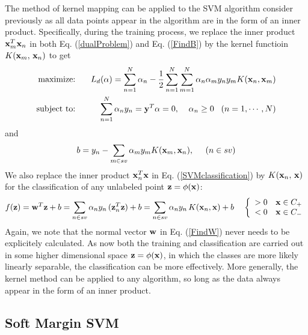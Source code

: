 \documentclass{article}
\begin{document}
The method of kernel mapping can be applied to the SVM algorithm 
consider previously as all data points appear in the algorithm are
in the form of an inner product. Specifically, during the training
process, we replace the inner product ${\bf x}_m^T{\bf x}_n$ in both 
Eq. (\ref{dualProblem}) and Eq. (\ref{FindB}) by the kernel functioin 
$K({\bf x}_m,\,{\bf x}_n)$ to get
\begin{eqnarray}
  \mbox{maximize:} \;\;\; && L_d({\bf\alpha})
  =\sum_{n=1}^N\alpha_n -\frac{1}{2}
  \sum_{n=1}^N \sum_{m=1}^N \alpha_n \alpha_m y_n y_m K({\bf x}_n,{\bf x}_m)
  \nonumber \\
  \mbox{subject to:} \;\;\; && \sum_{n=1}^N \alpha_n y_n
  ={\bf y}^T{\bf\alpha}=0, \;\;\;\; \alpha_n\ge 0\;\;\;(n=1,\cdots,N)
  \label{dualProblemKernel}
\end{eqnarray}
and
\begin{equation}
  b=y_n-\sum_{m \in sv} \alpha_m y_m K({\bf x}_m,{\bf x}_n),\;\;\;\;\;(n\in sv)
  \label{FindBKernel}
\end{equation}
We also replace the inner product ${\bf x}^T_n{\bf x}$ in 
Eq. (\ref{SVMclassification}) by $K({\bf x}_n,\,{\bf x})$ for the 
classification of any unlabeled point ${\bf z}=\phi({\bf x})$:
\begin{equation}
  f({\bf z})={\bf w}^T{\bf z}+b
  =\sum_{n\in sv}\alpha_ny_n\,({\bf z}_n^T{\bf z})+b
  =\sum_{n\in sv}\alpha_ny_n\,K({\bf x}_n,{\bf x})+b\;\;\;\;
  \left\{\begin{array}{ll}>0 & {\bf x}\in C_+\\<0 & {\bf x}\in C_-
  \end{array}\right.
  \label{SVMclassificationKernel}
\end{equation}
Again, we note that the normal vector ${\bf w}$ in Eq. (\ref{FindW}) 
never needs to be explicitely calculated. As now both the training
and classification are carried out in some higher dimensional space 
${\bf z}=\phi({\bf x})$, in which the classes are more likely linearly
separable, the classification can be more effectively. More generally, 
the kernel method can be applied to any algorithm, so long as the data
always appear in the form of an inner product.


\subsection{Soft Margin SVM}
\end{document}
